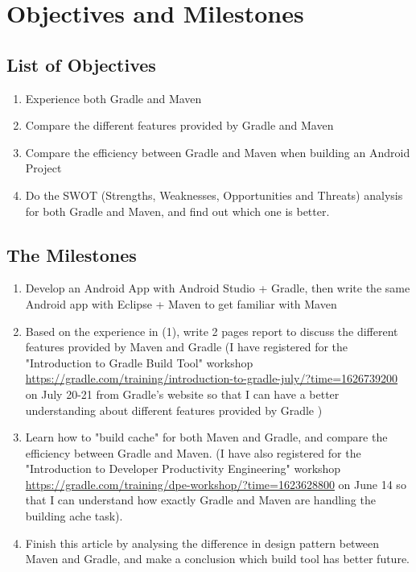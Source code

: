 \section{Objectives and Milestones}
\subsection{List of Objectives}
\begin{enumerate}
    \item Experience both Gradle and Maven
    \item Compare the different features provided by Gradle and Maven
    \item Compare the efficiency between Gradle and Maven when building an Android Project
    \item Do the SWOT (Strengths, Weaknesses, Opportunities and Threats) analysis for both Gradle and Maven, and find out which one is better.
\end{enumerate}


\subsection{The Milestones}
\begin{enumerate}
    \item Develop an Android App with Android Studio + Gradle, then write the same Android app with Eclipse + Maven to get familiar with Maven
    \item Based on the experience in (1), write 2 pages report to discuss the different features provided by Maven and Gradle (I have registered for the "Introduction to Gradle Build Tool" workshop \url{https://gradle.com/training/introduction-to-gradle-july/?time=1626739200} on July 20-21 from Gradle's website so that I can have a better understanding about different features provided by Gradle )
    \item Learn how to "build cache" for both Maven and Gradle, and compare the efficiency between Gradle and Maven. (I have also registered for the "Introduction to Developer Productivity Engineering" workshop \url{https://gradle.com/training/dpe-workshop/?time=1623628800} on June 14 so that I can understand how exactly Gradle and Maven are handling the building ache task).
    \item Finish this article by analysing the difference in design pattern between Maven and Gradle, and make a conclusion which build tool has better future.
\end{enumerate}
